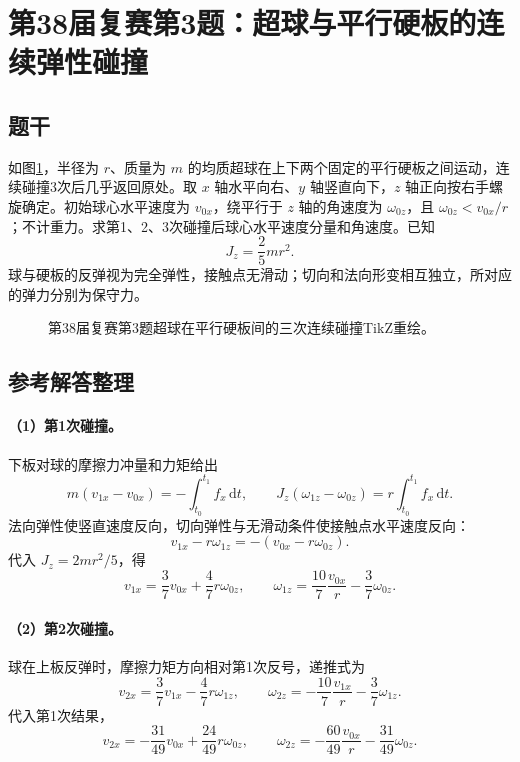 \section{第38届复赛第3题：超球与平行硬板的连续弹性碰撞}

\subsection{题干}
如图\ref{fig:cpho38q03}，半径为 $r$、质量为 $m$ 的均质超球在上下两个固定的平行硬板之间运动，连续碰撞3次后几乎返回原处。取 $x$ 轴水平向右、$y$ 轴竖直向下，$z$ 轴正向按右手螺旋确定。初始球心水平速度为 $v_{0x}$，绕平行于 $z$ 轴的角速度为 $\omega_{0z}$，且 $\omega_{0z}<v_{0x}/r$；不计重力。求第1、2、3次碰撞后球心水平速度分量和角速度。已知
\[
J_z=\frac25mr^2.
\]
球与硬板的反弹视为完全弹性，接触点无滑动；切向和法向形变相互独立，所对应的弹力分别为保守力。
\begin{figure}[htbp]\centering

\caption{第38届复赛第3题超球在平行硬板间的三次连续碰撞TikZ重绘。}\label{fig:cpho38q03}
\end{figure}

\subsection{参考解答整理}
\paragraph{（1）第1次碰撞。}
下板对球的摩擦力冲量和力矩给出
\[
m(v_{1x}-v_{0x})=-\int_{t_0}^{t_1}f_x\,\mathrm dt,\qquad
J_z(\omega_{1z}-\omega_{0z})=
r\int_{t_0}^{t_1}f_x\,\mathrm dt.
\]
法向弹性使竖直速度反向，切向弹性与无滑动条件使接触点水平速度反向：
\[
v_{1x}-r\omega_{1z}=-(v_{0x}-r\omega_{0z}).
\]
代入 $J_z=2mr^2/5$，得
\[
\boxed{v_{1x}=\frac37v_{0x}+\frac47r\omega_{0z},\qquad
\omega_{1z}=\frac{10}{7}\frac{v_{0x}}r-\frac37\omega_{0z}.}
\]

\paragraph{（2）第2次碰撞。}
球在上板反弹时，摩擦力矩方向相对第1次反号，递推式为
\[
v_{2x}=\frac37v_{1x}-\frac47r\omega_{1z},\qquad
\omega_{2z}=-\frac{10}{7}\frac{v_{1x}}r-\frac37\omega_{1z}.
\]
代入第1次结果，
\[
\boxed{v_{2x}=-\frac{31}{49}v_{0x}+\frac{24}{49}r\omega_{0z},\qquad
\omega_{2z}=-\frac{60}{49}\frac{v_{0x}}r-\frac{31}{49}\omega_{0z}.}
\]

